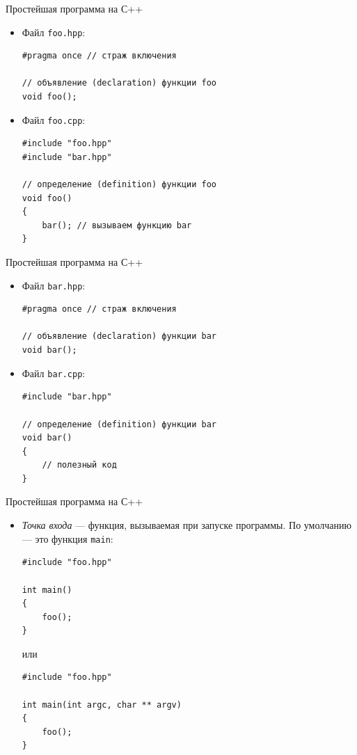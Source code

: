 \documentclass[aspectration=1610,t]{beamer}
\begin{document}
\begin{frame}[fragile]{Простейшая программа на С++}
    \begin{itemize}
        \item Файл {\tt foo.hpp}:
            {\small \begin{lstlisting}
#pragma once // страж включения

// объявление (declaration) функции foo
void foo();
            \end{lstlisting}}

        \item Файл {\tt foo.cpp}:
            \begin{lstlisting}
#include "foo.hpp"
#include "bar.hpp"

// определение (definition) функции foo
void foo()
{
    bar(); // вызываем функцию bar
}
            \end{lstlisting}
    \end{itemize}
\end{frame}

\begin{frame}[fragile]{Простейшая программа на С++}
    \begin{itemize}
        \item Файл {\tt bar.hpp}:
            {\small \begin{lstlisting}
#pragma once // страж включения

// объявление (declaration) функции bar
void bar();
            \end{lstlisting}}

        \item Файл {\tt bar.cpp}:
            \begin{lstlisting}
#include "bar.hpp"

// определение (definition) функции bar
void bar()
{
    // полезный код
}
            \end{lstlisting}
    \end{itemize}
\end{frame}

\begin{frame}[fragile]{Простейшая программа на С++}
    \begin{itemize}
        \item \emph{Точка входа} — функция, вызываемая при запуске программы.
            По умолчанию — это функция \verb!main!:
            {\small \begin{lstlisting}
#include "foo.hpp"

int main()
{
    foo();
}
            \end{lstlisting}}
            или
            {\small \begin{lstlisting}
#include "foo.hpp"

int main(int argc, char ** argv)
{
    foo();
}
            \end{lstlisting}}
    \end{itemize}
\end{frame}
\end{document}
